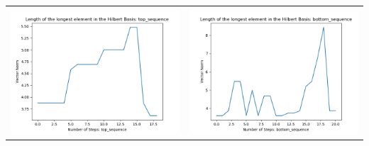 \documentclass[10pt]{article}
\begin{document}
\begin{tabular}{c|c}
\begin{minipage}{.4\textwidth}
\includegraphics[width=\textwidth]{"DATA/4d/5 generators 2 bound A/top_sequence LENGTH"}
\end{minipage} &
\begin{minipage}{.4\textwidth}
\includegraphics[width=\textwidth]{"DATA/4d/5 generators 2 bound A bottomup/bottom_sequence LENGTH"}
\end{minipage}
\end{tabular}
\end{document}
